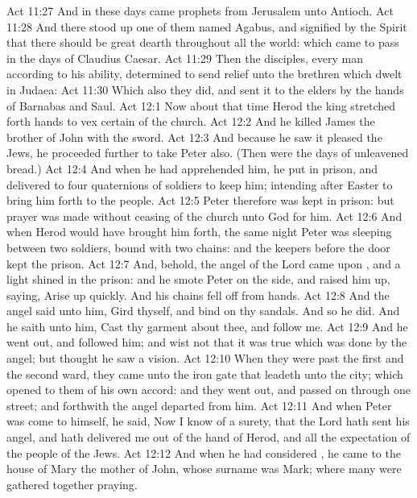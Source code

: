 \vs Act 11:27 And in these days came prophets from Jerusalem unto Antioch.
\vs Act 11:28 And there stood up one of them named Agabus, and signified by the Spirit that there should be great dearth throughout all the world: which came to pass in the days of Claudius Caesar.
\vs Act 11:29 Then the disciples, every man according to his ability, determined to send relief unto the brethren which dwelt in Judaea:
\vs Act 11:30 Which also they did, and sent it to the elders by the hands of Barnabas and Saul.
\vs Act 12:1 Now about that time Herod the king stretched forth  hands to vex certain of the church.
\vs Act 12:2 And he killed James the brother of John with the sword.
\vs Act 12:3 And because he saw it pleased the Jews, he proceeded further to take Peter also. (Then were the days of unleavened bread.)
\vs Act 12:4 And when he had apprehended him, he put  in prison, and delivered  to four quaternions of soldiers to keep him; intending after Easter to bring him forth to the people.
\vs Act 12:5 Peter therefore was kept in prison: but prayer was made without ceasing of the church unto God for him.
\vs Act 12:6 And when Herod would have brought him forth, the same night Peter was sleeping between two soldiers, bound with two chains: and the keepers before the door kept the prison.
\vs Act 12:7 And, behold, the angel of the Lord came upon , and a light shined in the prison: and he smote Peter on the side, and raised him up, saying, Arise up quickly. And his chains fell off from  hands.
\vs Act 12:8 And the angel said unto him, Gird thyself, and bind on thy sandals. And so he did. And he saith unto him, Cast thy garment about thee, and follow me.
\vs Act 12:9 And he went out, and followed him; and wist not that it was true which was done by the angel; but thought he saw a vision.
\vs Act 12:10 When they were past the first and the second ward, they came unto the iron gate that leadeth unto the city; which opened to them of his own accord: and they went out, and passed on through one street; and forthwith the angel departed from him.
\vs Act 12:11 And when Peter was come to himself, he said, Now I know of a surety, that the Lord hath sent his angel, and hath delivered me out of the hand of Herod, and  all the expectation of the people of the Jews.
\vs Act 12:12 And when he had considered , he came to the house of Mary the mother of John, whose surname was Mark; where many were gathered together praying.
